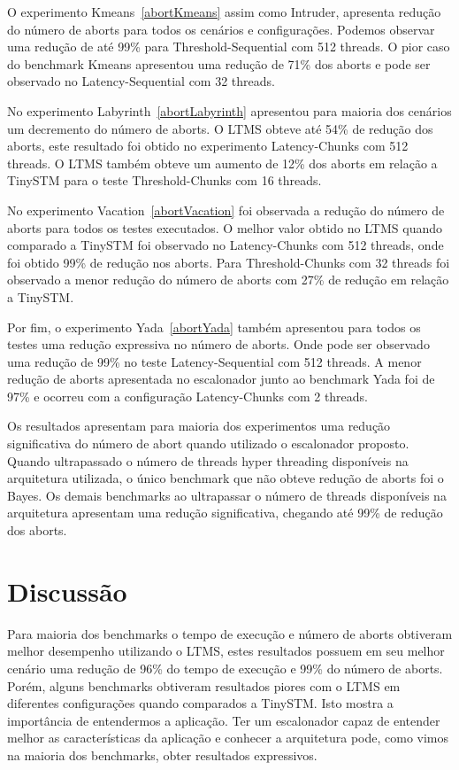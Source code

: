 \documentclass[diss,capa]{texufpel}
\begin{document}
O experimento Kmeans~\ref{abortKmeans} assim como Intruder, apresenta redução do número de aborts para todos os cenários e configurações. Podemos observar uma redução de até 99\% para Threshold-Sequential com 512 threads. O pior caso do benchmark Kmeans apresentou uma redução de 71\% dos aborts e pode ser observado no Latency-Sequential com 32 threads.



No experimento Labyrinth~\ref{abortLabyrinth} apresentou para maioria dos cenários um decremento do número de aborts. O LTMS obteve até 54\% de redução dos aborts, este resultado foi obtido no experimento Latency-Chunks com 512 threads. O LTMS também obteve um aumento de 12\% dos aborts em relação a TinySTM para o teste Threshold-Chunks com 16 threads.

No experimento Vacation~\ref{abortVacation} foi observada a redução do número de aborts para todos os testes executados. O melhor valor obtido no LTMS quando comparado a TinySTM foi observado no Latency-Chunks com 512 threads, onde foi obtido 99\% de redução nos aborts. Para Threshold-Chunks com 32 threads foi observado a menor redução do número de aborts com 27\% de redução em relação a TinySTM.

Por fim, o experimento Yada~\ref{abortYada} também apresentou para todos os testes uma redução expressiva no número de aborts. Onde pode ser observado uma redução de 99\% no teste Latency-Sequential com 512 threads. A menor redução de aborts apresentada no escalonador junto ao benchmark Yada foi de 97\% e ocorreu com a configuração Latency-Chunks com 2 threads.

Os resultados apresentam para maioria dos experimentos uma redução significativa do número de abort quando utilizado o escalonador proposto. Quando ultrapassado o número de threads hyper threading disponíveis na arquitetura utilizada, o único benchmark que não obteve redução de aborts foi o Bayes. Os demais benchmarks ao ultrapassar o número de threads disponíveis na arquitetura apresentam uma redução significativa, chegando até 99\% de redução dos aborts.



\section{Discussão}

Para maioria dos benchmarks o tempo de execução e número de aborts obtiveram melhor desempenho utilizando o LTMS, estes resultados possuem em seu melhor cenário uma redução de 96\% do tempo de execução e 99\% do número de aborts. Porém, alguns benchmarks obtiveram resultados piores com o LTMS em diferentes configurações quando comparados a TinySTM. Isto mostra a importância de entendermos a aplicação. Ter um escalonador capaz de entender melhor as características da aplicação e conhecer a arquitetura pode, como vimos na maioria dos benchmarks, obter resultados expressivos.
\end{document}
